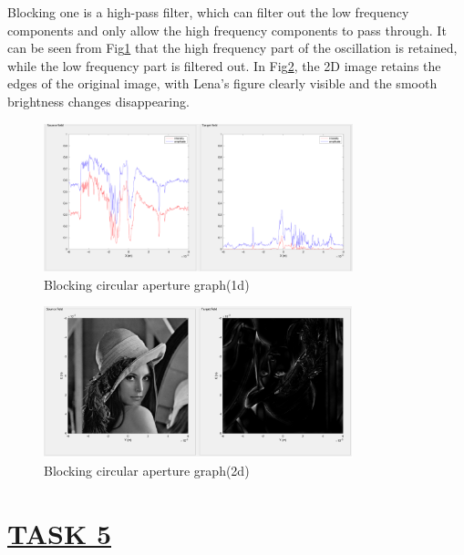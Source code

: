 \documentclass[fontsize=11pt]{scrartcl}
\begin{document}
Blocking one is a high-pass filter, which can filter out the low frequency components 
and only allow the high frequency components to pass through. 
It can be seen from Fig\ref{fig4.3} that the high frequency part of the oscillation is 
retained, while the low frequency part is filtered out. 
In Fig\ref{fig4.4}, the 2D image retains the edges of the original image, 
with Lena’s figure clearly visible and the smooth brightness changes disappearing.
\begin{figure}[H]
    \centering
     \includegraphics[width=0.8\textwidth]{img/4_3.png}
     \caption{Blocking circular aperture graph(1d)}
     \label{fig4.3}
\end{figure}
\begin{figure}[H]
    \centering
     \includegraphics[width=0.8\textwidth]{img/4_4.png}
     \caption{Blocking circular aperture graph(2d)}
     \label{fig4.4}
\end{figure}
\pagebreak
\section{\uline{TASK 5}}
\end{document}
